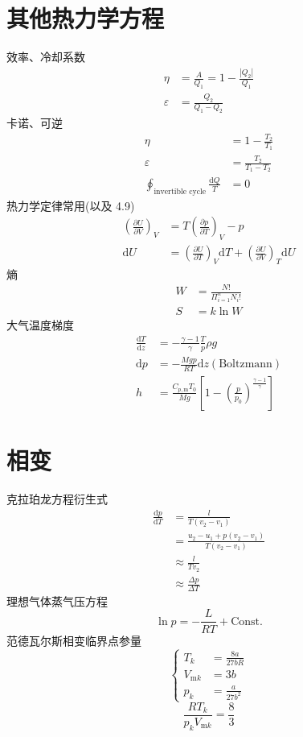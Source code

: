 \documentclass[10pt]{article}
\numberwithin{equation}{section}
\begin{document}
\begin{multicols}{3}
\begin{CJK}{UTF8}{song}
\section{其他热力学方程}
效率、冷却系数
\begin{align}
  \eta&=\frac{A}{Q_1}=1-\frac{|Q_2|}{Q_1} \\
  \varepsilon &=\frac{Q_2}{Q_1-Q_2}
\end{align}
卡诺、可逆
\begin{align}
  \eta&=1-\frac{T_2}{T_1} \\
  \varepsilon &=\frac{T_2}{T_1-T_2} \\
  \oint_{\textrm{invertible cycle}}\frac{\textrm{d}Q}{T}&=0
\end{align}
热力学定律常用(以及 4.9)
\begin{align}
  \left(\frac{\partial U}{\partial V}\right)_V&=T\left(\frac{\partial p}{\partial T}\right)_V-p \\
  \textrm{d}U&=\left(\frac{\partial U}{\partial T}\right)_V \textrm{d}T+\left(\frac{\partial U}{\partial V}\right)_T \textrm{d}U
\end{align}
熵
\begin{align}
  W&=\frac{N!}{\Pi_{i=1}^n N_i!} \\
  S&=k\ln W
\end{align}
大气温度梯度
\begin{align}
  \frac{\textrm{d}T}{\textrm{d}z}&=-\frac{\gamma-1}{\gamma} \frac{T}{p} \rho g\\
  \textrm{d}p&=-\frac{Mgp}{RT}\textrm{d}z(\textrm{Boltzmann})\\
  h&=\frac{C_{p,\textrm{m}}T_0}{Mg}\left[1-\left(\frac{p}{p_0}\right)^{\frac{\gamma -1}{\gamma}}\right]
\end{align}
\section{相变}
克拉珀龙方程衍生式
\begin{align}
  \frac{\textrm{d}p}{\textrm{d}T}&=\frac{l}{T(v_2-v_1)} \nonumber\\
  &=\frac{u_2-u_1+p(v_2-v_1)}{T(v_2-v_1)} \nonumber \\
  &\approx \frac{l}{Tv_2} \nonumber \\
  &\approx \frac{\Delta p}{\Delta T}
\end{align}
理想气体蒸气压方程
\begin{equation}
  \ln p=-\frac{L}{RT}+\textrm{Const.}
\end{equation}
范德瓦尔斯相变临界点参量
\begin{equation}
  \left\{
    \begin{align}
    T_k&=\frac{8a}{27bR}\\
    V_{\textrm{m}k}&=3b \\
    p_{k}&=\frac{a}{27b^2}
    \end{align} %
  \right.
\end{equation}
\begin{equation}
  \frac{RT_k}{p_kV_{\textrm{m}k}}=\frac{8}{3}
\end{equation}

\end{CJK}
\end{multicols}
\end{document}
